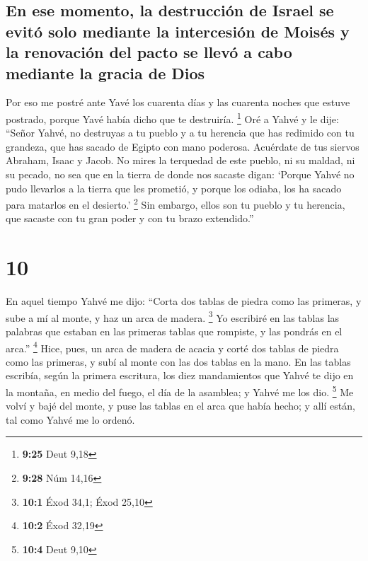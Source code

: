 \hypertarget{en-ese-momento-la-destrucciuxf3n-de-israel-se-evituxf3-solo-mediante-la-intercesiuxf3n-de-moisuxe9s-y-la-renovaciuxf3n-del-pacto-se-llevuxf3-a-cabo-mediante-la-gracia-de-dios}{%
\subsection{En ese momento, la destrucción de Israel se evitó solo
mediante la intercesión de Moisés y la renovación del pacto se llevó a
cabo mediante la gracia de
Dios}\label{en-ese-momento-la-destrucciuxf3n-de-israel-se-evituxf3-solo-mediante-la-intercesiuxf3n-de-moisuxe9s-y-la-renovaciuxf3n-del-pacto-se-llevuxf3-a-cabo-mediante-la-gracia-de-dios}}

 Por eso me postré ante Yavé los cuarenta días y las
cuarenta noches que estuve postrado, porque Yavé había dicho que te
destruiría. \footnote{\textbf{9:25} Deut 9,18}  Oré a
Yahvé y le dije: ``Señor Yahvé, no destruyas a tu pueblo y a tu herencia
que has redimido con tu grandeza, que has sacado de Egipto con mano
poderosa.  Acuérdate de tus siervos Abraham, Isaac y
Jacob. No mires la terquedad de este pueblo, ni su maldad, ni su pecado,
 no sea que en la tierra de donde nos sacaste digan:
`Porque Yahvé no pudo llevarlos a la tierra que les prometió, y porque
los odiaba, los ha sacado para matarlos en el desierto.' \footnote{\textbf{9:28}
  Núm 14,16}  Sin embargo, ellos son tu pueblo y tu
herencia, que sacaste con tu gran poder y con tu brazo extendido.''

\hypertarget{section-9}{%
\section{10}\label{section-9}}

 En aquel tiempo Yahvé me dijo: ``Corta dos tablas de
piedra como las primeras, y sube a mí al monte, y haz un arca de madera.
\footnote{\textbf{10:1} Éxod 34,1; Éxod 25,10}  Yo
escribiré en las tablas las palabras que estaban en las primeras tablas
que rompiste, y las pondrás en el arca.'' \footnote{\textbf{10:2} Éxod
  32,19}  Hice, pues, un arca de madera de acacia y corté
dos tablas de piedra como las primeras, y subí al monte con las dos
tablas en la mano.  En las tablas escribía, según la
primera escritura, los diez mandamientos que Yahvé te dijo en la
montaña, en medio del fuego, el día de la asamblea; y Yahvé me los dio.
\footnote{\textbf{10:4} Deut 9,10}  Me volví y bajé del
monte, y puse las tablas en el arca que había hecho; y allí están, tal
como Yahvé me lo ordenó.

